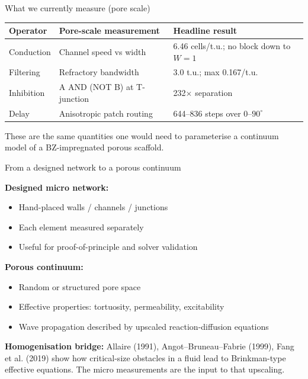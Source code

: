 \documentclass[aspectratio=169,11pt]{beamer}
\newcommand{\etal}{et al.}
\begin{document}
\begin{frame}{What we currently measure (pore scale)}

\begin{table}
\centering
\footnotesize
\begin{tabular}{p{3.2cm}p{5.0cm}p{5.0cm}}
\toprule
\textbf{Operator} & \textbf{Pore-scale measurement} & \textbf{Headline result} \\
\midrule
Conduction & Channel speed vs width & 6.46 cells/t.u.; no block down to $W=1$ \\
Filtering & Refractory bandwidth & 3.0 t.u.; max 0.167/t.u. \\
Inhibition & A AND (NOT B) at T-junction & 232$\times$ separation \\
Delay & Anisotropic patch routing & 644--836 steps over $0$--$90^\circ$ \\
\bottomrule
\end{tabular}
\end{table}

\vspace{0.3cm}
These are the same quantities one would need to parameterise a continuum model of a BZ-impregnated porous scaffold.

\end{frame}

\begin{frame}{From a designed network to a porous continuum}

\textbf{Designed micro network:}
\begin{itemize}
    \item Hand-placed walls / channels / junctions
    \item Each element measured separately
    \item Useful for proof-of-principle and solver validation
\end{itemize}

\vspace{0.3cm}
\textbf{Porous continuum:}
\begin{itemize}
    \item Random or structured pore space
    \item Effective properties: tortuosity, permeability, excitability
    \item Wave propagation described by upscaled reaction-diffusion equations
\end{itemize}

\vspace{0.3cm}
\textbf{Homogenisation bridge:} Allaire (1991), Angot--Bruneau--Fabrie (1999), Fang \etal{} (2019) show how critical-size obstacles in a fluid lead to Brinkman-type effective equations. The micro measurements are the input to that upscaling.

\end{frame}
\end{document}
